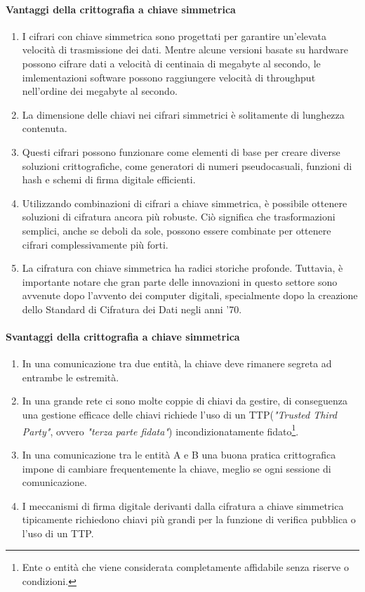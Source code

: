 \documentclass{article}
\theoremstyle{definition}
\begin{document}
\paragraph{Vantaggi della crittografia a chiave simmetrica}
\begin{enumerate}
    \item I cifrari con chiave simmetrica sono progettati per garantire un'elevata velocità di trasmissione dei dati. Mentre alcune versioni basate su hardware possono cifrare dati a velocità di centinaia di megabyte al secondo, le imlementazioni software possono raggiungere velocità di throughput nell'ordine dei megabyte al secondo.
    
    \item La dimensione delle chiavi nei cifrari simmetrici è solitamente di lunghezza contenuta.
    
    \item Questi cifrari possono funzionare come elementi di base per creare diverse soluzioni crittografiche, come generatori di numeri pseudocasuali, funzioni di hash e schemi di firma digitale efficienti.
    
    \item Utilizzando combinazioni di cifrari a chiave simmetrica, è possibile ottenere soluzioni di cifratura ancora più robuste. Ciò significa che trasformazioni semplici, anche se deboli da sole, possono essere combinate per ottenere cifrari complessivamente più forti.
    
    \item La cifratura con chiave simmetrica ha radici storiche profonde. Tuttavia, è importante notare che gran parte delle innovazioni in questo settore sono avvenute dopo l'avvento dei computer digitali, specialmente dopo la creazione dello Standard di Cifratura dei Dati negli anni '70.
\end{enumerate}

\paragraph{Svantaggi della crittografia a chiave simmetrica}
\begin{enumerate}
    \item In una comunicazione tra due entità, la chiave deve rimanere segreta ad entrambe le estremità.
    \item In una grande rete ci sono molte coppie di chiavi da gestire, di conseguenza una gestione efficace delle chiavi richiede l'uso di un TTP(\textit{"Trusted Third Party"}, ovvero \textit{"terza parte fidata"}) incondizionatamente fidato\footnote{Ente o entità che viene considerata completamente affidabile senza riserve o condizioni.}.
    \item In una comunicazione tra le entità A e B una buona pratica crittografica impone di cambiare frequentemente la chiave, meglio se ogni sessione di comunicazione.
    \item I meccanismi di firma digitale derivanti dalla cifratura a chiave simmetrica tipicamente richiedono chiavi più grandi per la funzione di verifica pubblica o l'uso di un TTP.
\end{enumerate}
\end{document}
